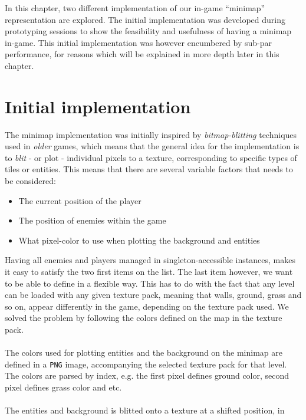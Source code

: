 In this chapter,  two different implementation of our in-game
``minimap'' representation are explored. The initial implementation was developed during prototyping sessions to show
the feasibility and usefulness of having a minimap in-game. This initial
implementation was however encumbered by sub-par performance,
for reasons which will be explained in more depth later in this chapter.

\section{Initial implementation}
The minimap implementation was initially inspired by \textit{bitmap-blitting}
techniques used in \textit{older} games, which means that the general idea for
the implementation is to \textit{blit} - or plot - individual pixels to a
texture, corresponding to specific types of tiles or entities. This means that
there are several variable factors that needs to be considered:
\begin{itemize}
    \item The current position of the player
    \item The position of enemies within the game 
    \item What pixel-color to use when plotting the background and entities
\end{itemize}
Having all enemies and players managed in singleton-accessible instances,
makes it easy to satisfy the two first items on the list. The last item
however, we want to be able to define in a flexible way. This
has to do with the fact that any level can be loaded with any given
texture pack, meaning that walls, ground, grass and so on, appear differently
in the game, depending on the texture pack used.
We solved the problem by following the colors defined on the map in the texture pack. 
\\
\\
The colors used for plotting entities and the background on the minimap are
defined in a \texttt{PNG} image, accompanying the selected texture pack for that
level. The colors are parsed by index, e.g. the first pixel defines ground
color, second pixel defines grass color and etc.
\\
\\
The entities and background is blitted onto a texture at a shifted position, in
